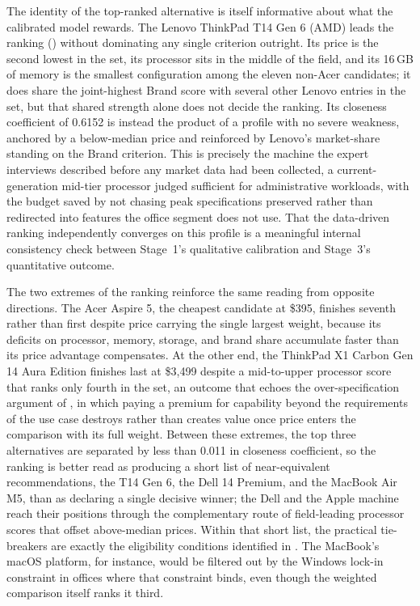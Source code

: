 The identity of the top-ranked alternative is itself informative about what the calibrated
model rewards. The Lenovo ThinkPad T14 Gen 6 (AMD) leads the ranking
() without dominating any single criterion outright. Its price is
the second lowest in the set, its processor sits in the middle of the field, and its
16\,GB of memory is the smallest configuration among the eleven non-Acer candidates; it
does share the joint-highest Brand score with several other Lenovo entries in the set, but
that shared strength alone does not decide the ranking. Its closeness coefficient of
0.6152 is instead the product of a profile with no severe weakness, anchored by a
below-median price and reinforced by Lenovo's market-share standing on the Brand
criterion. This is precisely the machine the expert interviews described before
any market data had been collected, a current-generation mid-tier processor judged
sufficient for administrative workloads, with the budget saved by not chasing peak
specifications preserved rather than redirected into features the office
segment does not use. That the data-driven ranking independently converges on this
profile is a meaningful internal consistency check between Stage~1's qualitative
calibration and Stage~3's quantitative outcome.

The two extremes of the ranking reinforce the same reading from opposite directions. The
Acer Aspire 5, the cheapest candidate at \$395, finishes seventh rather than first despite
price carrying the single largest weight, because its deficits on processor, memory,
storage, and brand share accumulate faster than its price advantage compensates. At the
other end, the ThinkPad X1 Carbon Gen 14 Aura Edition finishes last at \$3{,}499 despite a
mid-to-upper processor score that ranks only fourth in the set, an outcome that echoes the
over-specification argument of \textcite{rau_optimal_2018}, in which paying a premium for
capability beyond the requirements of the use case destroys rather than creates value once
price enters the comparison with its full weight. Between these extremes, the top three
alternatives are separated by less than 0.011 in closeness coefficient, so the ranking is
better read as producing a short list of near-equivalent recommendations, the T14 Gen 6,
the Dell 14 Premium, and the MacBook Air M5, than as declaring a single decisive winner;
the Dell and the Apple machine reach their positions through the complementary route of
field-leading processor scores that offset above-median prices. Within that short list,
the practical tie-breakers are exactly the eligibility conditions identified in
. The MacBook's macOS platform, for instance, would be filtered
out by the Windows lock-in constraint in offices where that constraint binds, even though
the weighted comparison itself ranks it third.

